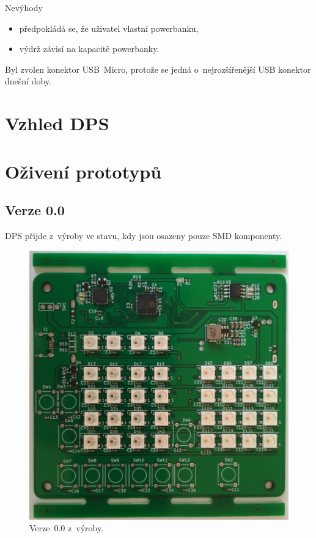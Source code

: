   Nevýhody
  \begin{itemize}
    \item předpokládá se, že uživatel vlastní powerbanku,
    \item výdrž závisí na kapacitě powerbanky. 
  \end{itemize}

  Byl zvolen konektor USB~Micro, protože se jedná o~nejrozšířenější USB konektor dnešní doby.

  \section{Vzhled DPS}
  
  \section{Oživení prototypů}
  \subsection{Verze 0.0}
  DPS přijde z~výroby ve stavu, kdy jsou osazeny pouze SMD komponenty.

  \begin{figure}[!h]
    \begin{center}
      \includegraphics[scale=0.1]{obrazky/Verze0_vyroba_kolejnice.jpg}
    \end{center}
    \caption[Verze~0.0 z~výroby]{Verze~0.0 z~výroby.}
  \end{figure}

